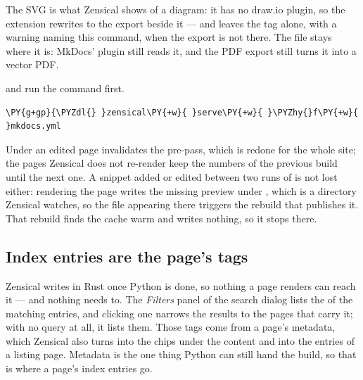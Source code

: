 \documentclass[a4paper,twoside]{article}
\begin{document}
The SVG is what Zensical shows of a diagram: it has no draw.io plugin, so the
extension rewrites  to the export beside it --- and leaves
the tag alone, with a warning naming this command, when the export is not
there. The  file stays where it is: MkDocs' plugin still reads it, and
the PDF export still turns it into a vector PDF.

 and  run the command first.
\begin{tscode}[lang=console, engine=pygments]
\begin{Verbatim}[commandchars=\\\{\},breaklines, breakanywhere, commandchars=\\\{\}]
\PY{g+gp}{\PYZdl{} }zensical\PY{+w}{ }serve\PY{+w}{ }\PYZhy{}f\PY{+w}{ }mkdocs.yml
\end{Verbatim}
\end{tscode}
Under  an edited page invalidates the pre-pass, which is redone
for the whole site; the pages Zensical does not re-render keep the numbers of
the previous build until the next one. A snippet added or edited between two
runs of  is not lost either: rendering the page writes
the missing preview under , which is a directory Zensical watches, so
the file appearing there triggers the rebuild that publishes it. That rebuild
finds the cache warm and writes nothing, so it stops there.
\subsection{Index entries are the page's tags}
Zensical writes  in Rust once Python is done, so nothing a page
renders can reach it --- and nothing needs to. The \emph{Filters} panel of the search
dialog lists the  of the matching entries, and clicking one narrows the
results to the pages that carry it; with no query at all, it lists them. Those
tags come from a page's  metadata, which Zensical also turns into the
chips under the content and into the entries of a 
listing page. Metadata is the one thing Python can still hand the build, so
that is where a page's index entries go.
\end{document}
